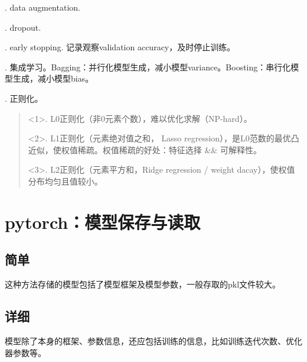 \documentclass[letterpaper,10pt,english]{sphinxmanual}
\begin{document}
. data augmentation.

. dropout.

. early stopping. 记录观察validation accuracy，及时停止训练。

. 集成学习。Bagging：并行化模型生成，减小模型variance。Boosting：串行化模型生成，减小模型bias。

. 正则化。
\begin{quote}

\textless{}1\textgreater{}. L0正则化（非0元素个数），难以优化求解（NP-hard）。

\textless{}2\textgreater{}. L1正则化（元素绝对值之和， Lasso regression），是L0范数的最优凸近似，使权值稀疏。权值稀疏的好处：特征选择 \&\& 可解释性。

\textless{}3\textgreater{}. L2正则化（元素平方和，Ridge regression / weight dacay），使权值分布均匀且值较小。
\end{quote}


\section{pytorch：模型保存与读取}
\label{\detokenize{deepLearning/05_modelSave:pytorch}}\label{\detokenize{deepLearning/05_modelSave::doc}}

\subsection{简单}
\label{\detokenize{deepLearning/05_modelSave:id1}}
%
\begin{sphinxVerbatim}[commandchars=\\\{\}]
 
 
  
\end{sphinxVerbatim}

这种方法存储的模型包括了模型框架及模型参数，一般存取的pkl文件较大。


\subsection{详细}
\label{\detokenize{deepLearning/05_modelSave:id2}}
模型除了本身的框架、参数信息，还应包括训练的信息，比如训练迭代次数、优化器参数等。
\end{document}
